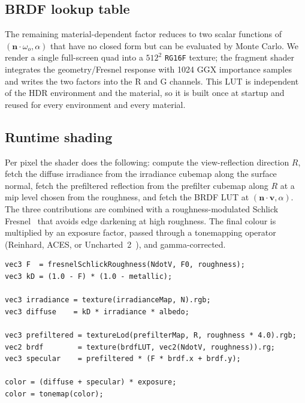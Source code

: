 \documentclass{egpubl}
\begin{document}
\subsection{BRDF lookup table}

The remaining material-dependent factor reduces to two scalar functions of
$(\mathbf{n}\!\cdot\!\omega_o, \alpha)$ that have no closed form but can be
evaluated by Monte Carlo. We render a single full-screen quad into a $512^2$
\texttt{RG16F} texture; the fragment shader integrates the geometry/Fresnel
response with 1024 GGX importance samples and writes the two factors into
the R and G channels. This LUT is independent of the HDR environment and
the material, so it is built once at startup and reused for every
environment and every material.

\subsection{Runtime shading}

Per pixel the shader does the following: compute the view-reflection
direction $R$, fetch the diffuse irradiance from the irradiance cubemap
along the surface normal, fetch the prefiltered reflection from the
prefilter cubemap along $R$ at a mip level chosen from the roughness, and
fetch the BRDF LUT at $(\mathbf{n}\!\cdot\!\mathbf{v}, \alpha)$. The three
contributions are combined with a roughness-modulated Schlick
Fresnel~\cite{Lazarov2013} that avoids edge darkening at high roughness.
The final colour is multiplied by an exposure factor, passed through a
tonemapping operator (Reinhard, ACES, or Uncharted~2~\cite{Hable2010}), and
gamma-corrected.

\begin{lstlisting}[caption={Core of the per-pixel IBL evaluation.},
                   label={lst:pbr}]
vec3 F  = fresnelSchlickRoughness(NdotV, F0, roughness);
vec3 kD = (1.0 - F) * (1.0 - metallic);

vec3 irradiance = texture(irradianceMap, N).rgb;
vec3 diffuse    = kD * irradiance * albedo;

vec3 prefiltered = textureLod(prefilterMap, R, roughness * 4.0).rgb;
vec2 brdf        = texture(brdfLUT, vec2(NdotV, roughness)).rg;
vec3 specular    = prefiltered * (F * brdf.x + brdf.y);

color = (diffuse + specular) * exposure;
color = tonemap(color);
\end{lstlisting}

\end{document}
